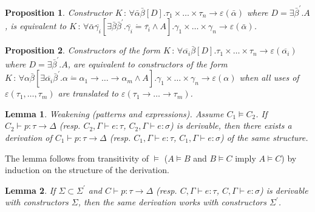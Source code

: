 \documentclass{article}
\newcommand{\colons}{\,:\,}
\newcommand{\tmem}[1]{{\em #1\/}}
\newtheorem{lemma}{Lemma}
\newtheorem{proposition}{Proposition}
\begin{document}
\begin{proposition}
  Constructor $K \colons \forall \bar{\alpha} \bar{\beta} [D] . \tau_1 \times
  \ldots \times \tau_n \rightarrow \varepsilon (\bar{\alpha})$ where $D =
  \exists \bar{\beta}^{\prime} .A$, is equivalent to $K \colons \forall
  \bar{\alpha} \overline{\gamma_i} [\exists \bar{\beta} \bar{\beta}^{\prime} .
  \overline{\gamma_i} \dot{=} \overline{\tau_i} \wedge A] . \gamma_1 \times
  \ldots \times \gamma_n \rightarrow \varepsilon (\bar{\alpha})$.
\end{proposition}

\begin{proposition}
  \label{collapse-ty-args}Constructors of the form $K \colons \forall
  \overline{\alpha_i} \bar{\beta} [D] . \tau_1 \times \ldots \times \tau_n
  \rightarrow \varepsilon (\overline{\alpha_i})$ where $D = \exists
  \bar{\beta}^{\prime} .A$, are equivalent to constructors of the form $K
  \colons \forall \alpha \bar{\beta} [\exists \overline{\alpha_i}
  \bar{\beta}^{\prime} . \alpha \dot{=} \alpha_1 \rightarrow \ldots
  \rightarrow \alpha_m \wedge A] . \gamma_1 \times \ldots \times \gamma_n
  \rightarrow \varepsilon (\alpha)$ when all uses of $\varepsilon (\tau_1,
  \ldots, \tau_m)$ are translated to $\varepsilon (\tau_1 \rightarrow \ldots
  \rightarrow \tau_m)$.
\end{proposition}

\begin{lemma}
  \label{Weakening}{\tmem{Weakening}} (patterns and expressions). Assume $C_1
  \vDash C_2$. If $C_2 \vdash p : \tau \longrightarrow \Delta$ (resp. $C_2,
  \Gamma \vdash e : \tau$, $C_2, \Gamma \vdash e : \sigma$) is derivable, then
  there exists a derivation of $C_1 \vdash p : \tau \longrightarrow \Delta$
  (resp. $C_1, \Gamma \vdash e : \tau$, $C_1, \Gamma \vdash e : \sigma$) of
  the same structure.
\end{lemma}

The lemma follows from transitivity of $\vDash$ ($A \vDash B$ and $B \vDash C$
imply $A \vDash C$) by induction on the structure of the derivation.

\begin{lemma}
  \label{MoreCstrs}If $\Sigma \subset \Sigma^{\prime}$ and $C \vdash p : \tau
  \longrightarrow \Delta$ (resp. $C, \Gamma \vdash e : \tau$, $C, \Gamma
  \vdash e : \sigma$) is derivable with constructors $\Sigma$, then the same
  derivation works with constructors $\Sigma^{\prime}$.
\end{lemma}
\end{document}
